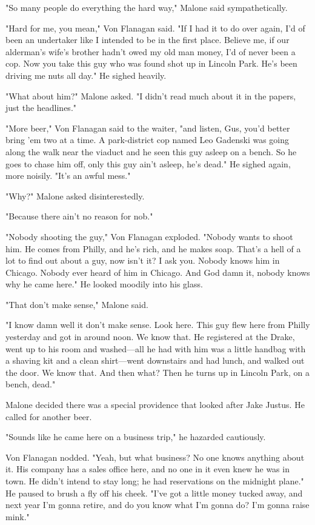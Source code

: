 \documentclass{novel}
\begin{document}
"So many people do everything the hard way," Malone said sympathetically.

"Hard for me, you mean," Von Flanagan said. "If I had it to do over again, I'd of been an undertaker like I intended to be in the first place. Believe me, if our alderman's wife's brother hadn't owed my old man money, I'd of never been a cop. Now you take this guy who was found shot up in Lincoln Park. He's been driving me nuts all day." He sighed heavily.

"What about him?" Malone asked. "I didn't read much about it in the papers, just the headlines."

"More beer," Von Flanagan said to the waiter, "and listen, Gus, you'd better bring 'em two at a time. A park-district cop named Leo Gadenski was going along the walk near the viaduct and he seen this guy asleep on a bench. So he goes to chase him off, only this guy ain't asleep, he's dead." He sighed again, more noisily. "It's an awful mess."

"Why?" Malone asked disinterestedly.

"Because there ain't no reason for nob."

"Nobody shooting the guy," Von Flanagan exploded. "Nobody wants to shoot him. He comes from Philly, and he's rich, and he makes soap. That's a hell of a lot to find out about a guy, now isn't it? I ask you. Nobody knows him in Chicago. Nobody ever heard of him in Chicago. And God damn it, nobody knows why he came here." He looked moodily into his glass.

"That don't make sense," Malone said.

"I know damn well it don't make sense. Look here. This guy flew here from Philly yesterday and got in around noon. We know that. He registered at the Drake, went up to his room and washed—all he had with him was a little handbag with a shaving kit and a clean shirt—went downstairs and had lunch, and walked out the door. We know that. And then what? Then he turns up in Lincoln Park, on a bench, dead."

Malone decided there was a special providence that looked after Jake Justus. He called for another beer.

"Sounds like he came here on a business trip," he hazarded cautiously.

Von Flanagan nodded. "Yeah, but what business? No one knows anything about it. His company has a sales office here, and no one in it even knew he was in town. He didn't intend to stay long; he had reservations on the midnight plane." He paused to brush a fly off his cheek. "I've got a little money tucked away, and next year I'm gonna retire, and do you know what I'm gonna do? I'm gonna raise mink."
\end{document}
